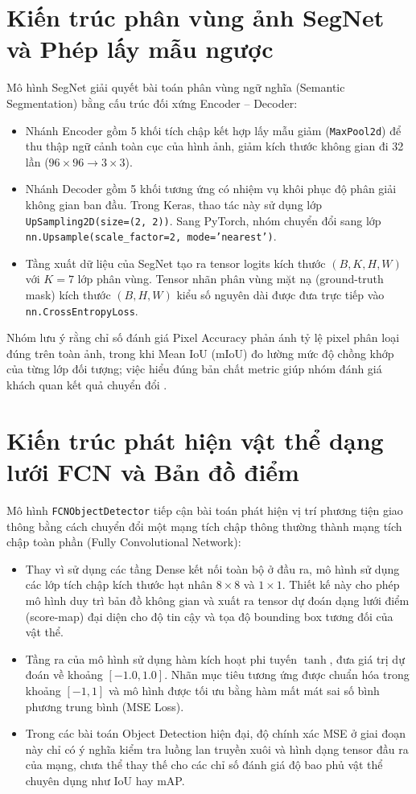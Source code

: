 \section{Kiến trúc phân vùng ảnh SegNet và Phép lấy mẫu ngược}
Mô hình SegNet giải quyết bài toán phân vùng ngữ nghĩa (Semantic Segmentation) bằng cấu trúc đối xứng Encoder -- Decoder:
\begin{itemize}
\item Nhánh Encoder gồm 5 khối tích chập kết hợp lấy mẫu giảm (\texttt{MaxPool2d}) để thu thập ngữ cảnh toàn cục của hình ảnh, giảm kích thước không gian đi 32 lần ($96\times 96 \rightarrow 3\times 3$).
\item Nhánh Decoder gồm 5 khối tương ứng có nhiệm vụ khôi phục độ phân giải không gian ban đầu. Trong Keras, thao tác này sử dụng lớp \texttt{UpSampling2D(size=(2, 2))}. Sang PyTorch, nhóm chuyển đổi sang lớp \texttt{nn.Upsample(scale\_factor=2, mode='nearest')}.
\item Tầng xuất dữ liệu của SegNet tạo ra tensor logits kích thước $(B, K, H, W)$ với $K = 7$ lớp phân vùng. Tensor nhãn phân vùng mặt nạ (ground-truth mask) kích thước $(B, H, W)$ kiểu số nguyên dài được đưa trực tiếp vào \texttt{nn.CrossEntropyLoss}.
\end{itemize}
Nhóm lưu ý rằng chỉ số đánh giá Pixel Accuracy phản ánh tỷ lệ pixel phân loại đúng trên toàn ảnh, trong khi Mean IoU (mIoU) đo lường mức độ chồng khớp của từng lớp đối tượng; việc hiểu đúng bản chất metric giúp nhóm đánh giá khách quan kết quả chuyển đổi \cite{badrinarayanan2017segnet}.

\section{Kiến trúc phát hiện vật thể dạng lưới FCN và Bản đồ điểm}
Mô hình \texttt{FCNObjectDetector} tiếp cận bài toán phát hiện vị trí phương tiện giao thông bằng cách chuyển đổi một mạng tích chập thông thường thành mạng tích chập toàn phần (Fully Convolutional Network):
\begin{itemize}
\item Thay vì sử dụng các tầng Dense kết nối toàn bộ ở đầu ra, mô hình sử dụng các lớp tích chập kích thước hạt nhân $8\times 8$ và $1\times 1$. Thiết kế này cho phép mô hình duy trì bản đồ không gian và xuất ra tensor dự đoán dạng lưới điểm (score-map) đại diện cho độ tin cậy và tọa độ bounding box tương đối của vật thể.
\item Tầng ra của mô hình sử dụng hàm kích hoạt phi tuyến $\tanh$, đưa giá trị dự đoán về khoảng $[-1.0, 1.0]$. Nhãn mục tiêu tương ứng được chuẩn hóa trong khoảng $[-1, 1]$ và mô hình được tối ưu bằng hàm mất mát sai số bình phương trung bình (MSE Loss).
\item Trong các bài toán Object Detection hiện đại, độ chính xác MSE ở giai đoạn này chỉ có ý nghĩa kiểm tra luồng lan truyền xuôi và hình dạng tensor đầu ra của mạng, chưa thể thay thế cho các chỉ số đánh giá độ bao phủ vật thể chuyên dụng như IoU hay mAP.
\end{itemize}
